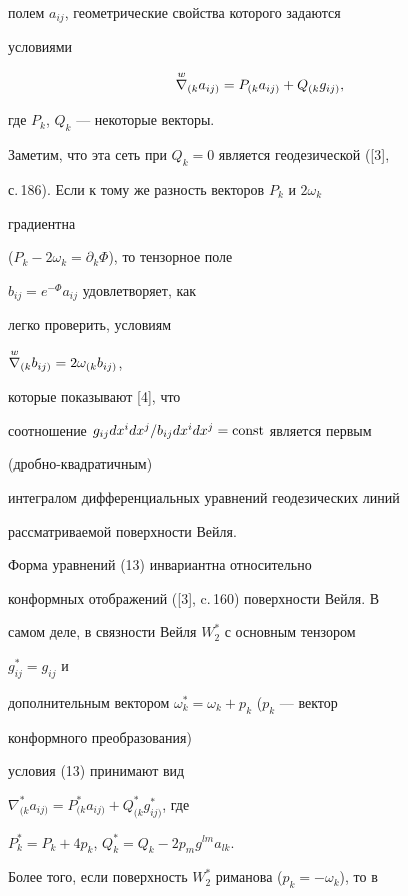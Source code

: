 полем $a_{ij}$, геометрические свойства которого задаются 


условиями 


\begin{equation} 


\up{w}{\nabla}_{(k}a_{ij)}=P_{(k}a_{ij)}+ 


Q_{(k}g_{ij)}, 


\end{equation} 


где $P_k$, $Q_k$ --- некоторые векторы. 


 


Заметим, что эта сеть при $Q_k=0$ является геодезической ([3], 


с.\,186). Если к тому же разность векторов $P_k$ и $2\omega_k$ 


градиентна 


($P_k-2\omega_k=\partial_k\Phi$), то тензорное поле 


$b_{ij}=e^{-\Phi}a_{ij}$ удовлетворяет, как 


легко проверить, условиям 


$\overset{w}{\nabla}{}_{(k}b_{ij)}=2\omega_{(k}b_{ij)}$, 


которые показывают [4], что 


соотношение $g_{ij}dx^i dx^j/b_{ij}dx^i dx^j=\operatorname{const}$ является первым 


(дробно-квадратичным) 


интегралом дифференциальных уравнений геодезических линий 


рассматриваемой поверхности Вейля. 


 


Форма уравнений (13) инвариантна относительно 


конформных отображений ([3], c.\,160) поверхности Вейля. В 


самом деле, в связности Вейля $W^*_2$ с основным тензором 


$g^*_{ij}=g_{ij}$ и 


дополнительным вектором $\omega^*_k=\omega_k+p_k$ ($p_k$ --- вектор 


конформного преобразования) 


условия (13) принимают вид 


$\nabla^*_{(k}a_{ij)}=P^*_{(k}a_{ij)}+Q^*_{(k}g^*_{ij)}$, где 


$P^*_k=P_k+4p_k$, $Q^*_k=Q_k-2p_m g^{lm}a_{lk}$. 


Более того, если поверхность $W^*_2$ риманова ($p_k=-\omega_k$), то в 


